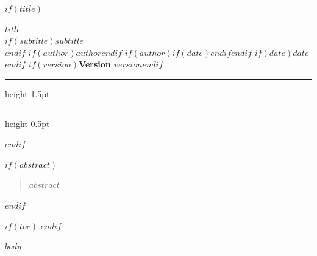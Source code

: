 \documentclass[$if(fontsize)$$fontsize$$else$11pt$endif$,$if(papersize)$$papersize$paper$else$letterpaper$endif$]{article}
\newcommand{\sep}{\enspace{\color{rulecolor}\textbullet}\enspace}
\begin{document}
\thispagestyle{plain}

$if(title)$
\begin{flushleft}
  {\LARGE\bfseries\sffamily\color{headingcolor} $title$}\\[0.3em]
  $if(subtitle)${\large\itshape $subtitle$}\\[0.3em]$endif$
  {\small\sffamily
    $if(author)$$author$$endif$%
    $if(author)$$if(date)$\sep$endif$$endif$%
    $if(date)$$date$$endif$%
    $if(version)$\sep\textbf{Version $version$}$endif$%
  }
\end{flushleft}
\vspace{0.3em}
{\color{accentcolor}\hrule height 1.5pt}
\vspace{0.05em}
{\color{rulecolor}\hrule height 0.5pt}
\vspace{0.8em}
$endif$

$if(abstract)$
\begin{quote}
  \small\itshape $abstract$
\end{quote}
\vspace{0.5em}
$endif$

$if(toc)$
\tableofcontents
\vspace{1em}
\vspace{1em}
$endif$

$body$
\end{document}

